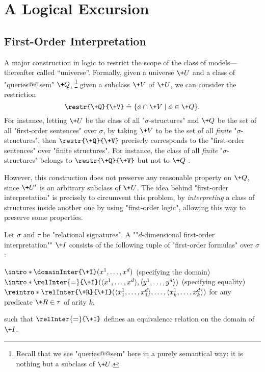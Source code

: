 \section{A Logical Excursion}
\label{sec:preliminaries-automatic-structures-logic}

\subsection{First-Order Interpretation}

A major construction in logic to restrict the scope of the class
of models---thereafter called ``universe''.
Formally, given a universe $\+U$ and a class of "queries@@sem" $\+Q$,%
\footnote{Recall that we see "queries@@sem" here in a purely semantical way: it is nothing but a subclass of $\+U$.}
given a subclass $\+V$ of $\+U$, we can consider the restriction
\[
	\restr{\+Q}{\+V} \defeq \{\phi \cap \+V \mid \phi \in \+Q\}.
\]
For instance, letting $\+U$ be the class of all "$\sigma$-structures" and $\+Q$ be the set of all 
"first-order sentences" over $\sigma$, by taking $\+V$ to be the set of all \emph{finite}
"$\sigma$-structures", then $\restr{\+Q}{\+V}$ precisely corresponds to
the "first-order sentences" over "finite structures". For instance, the class of all
\emph{finite} "$\sigma$-structures" belongs to $\restr{\+Q}{\+V}$ but not to
$\+Q$ .

However, this construction does not preserve any reasonable property on $\+Q$,
since $\+U'$ is an arbitrary subclass of $\+U$. The idea behind "first-order interpretation"
is precisely to circumvent this problem, by \emph{interpreting} a class of structures
inside another one by using "first-order logic", allowing this way to preserve some properties.

Let $\sigma$ and $\tau$ be "relational signatures".
A \AP ""$d$-dimensional first-order interpretation"" $\+I$ consists of the following tuple of
"first-order formulas" over $\sigma$:
\begin{itemize}
	\itemAP $\intro*\domainInter{\+I}(x^1,\hdots, x^d)$ (specifying the domain)
	\itemAP $\intro*\relInter{=}{\+I}(\tup{x^1,\hdots, x^d}, \tup{y^1,\hdots, y^d})$ (specifying equality)
	\itemAP $\reintro*\relInter{\+R}{\+I}(\tup{x^1_1,\hdots,x^d_1}, \hdots, \tup{x^1_k,\hdots,x^d_k})$
		for any predicate $\+R \in \tau$ of arity $k$,
\end{itemize}
such that $\relInter{=}{\+I}$ defines an equivalence relation on the domain of $\+I$.

